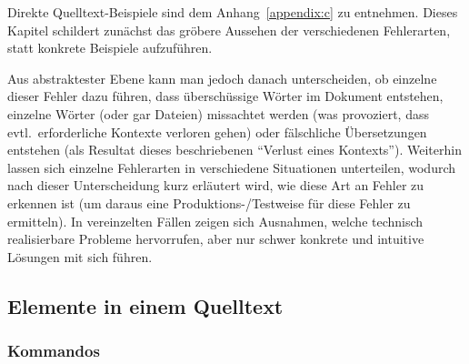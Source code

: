 Direkte Quelltext-Beispiele sind dem Anhang~\ref{appendix:c} zu entnehmen. Dieses Kapitel schildert zunächst das gröbere Aussehen der verschiedenen Fehlerarten, statt konkrete Beispiele aufzuführen. 

Aus abstraktester Ebene kann man jedoch danach unterscheiden, ob einzelne dieser Fehler dazu führen, dass überschüssige Wörter im Dokument entstehen, einzelne Wörter (oder gar Dateien) missachtet werden (was provoziert, dass evtl.\ erforderliche Kontexte verloren gehen) oder fälschliche Übersetzungen entstehen (als Resultat dieses beschriebenen \enquote{Verlust eines Kontexts}). Weiterhin lassen sich einzelne Fehlerarten in verschiedene Situationen unterteilen, wodurch nach dieser Unterscheidung kurz erläutert wird, wie diese Art an Fehler zu erkennen ist (um daraus eine Produktions-/Testweise für diese Fehler zu ermitteln). In vereinzelten Fällen zeigen sich Ausnahmen, welche technisch realisierbare Probleme hervorrufen, aber nur schwer konkrete und intuitive Lösungen mit sich führen.




\subsection{Elemente in einem Quelltext}
\subsubsection{Kommandos}
